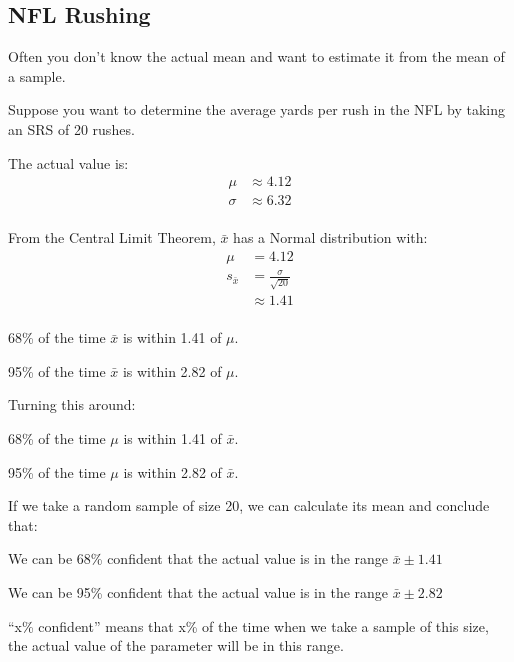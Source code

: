 \documentclass[landscape]{exam}
\begin{document}
  \subsection{NFL Rushing}
  Often you don't know the actual mean and want to estimate it from the mean of
  a sample.

  Suppose you want to determine the average yards per rush in the NFL by taking
  an SRS of 20 rushes.

  The actual value is:
  \begin{align*}
    \mu    & \approx 4.12 \\
    \sigma & \approx 6.32 \\
  \end{align*}

  From the Central Limit Theorem, $\bar{x}$ has a Normal distribution with:
  \begin{align*}
    \mu         & = 4.12 \\
    s_{\bar{x}} & = \frac{\sigma}{\sqrt{20}} \\
                & \approx 1.41 \\
  \end{align*}

  \begin{itemize*}
    \item 68\% of the time $\bar{x}$ is within 1.41 of $\mu$.
    \item 95\% of the time $\bar{x}$ is within 2.82 of $\mu$.
  \end{itemize*}

  Turning this around:
  \begin{itemize*}
    \item 68\% of the time $\mu$ is within 1.41 of $\bar{x}$.
    \item 95\% of the time $\mu$ is within 2.82 of $\bar{x}$.
  \end{itemize*}

  If we take a random sample of size 20, we can calculate its mean and conclude
  that:
  \begin{itemize*}
    \item We can be 68\% confident that the actual value is in the range
      $\bar{x} \pm 1.41$
    \item We can be 95\% confident that the actual value is in the range
      $\bar{x} \pm 2.82$
  \end{itemize*}

  ``x\% confident'' means that x\% of the time when we take a sample of this
  size, the actual value of the parameter will be in this range.
\end{document}
